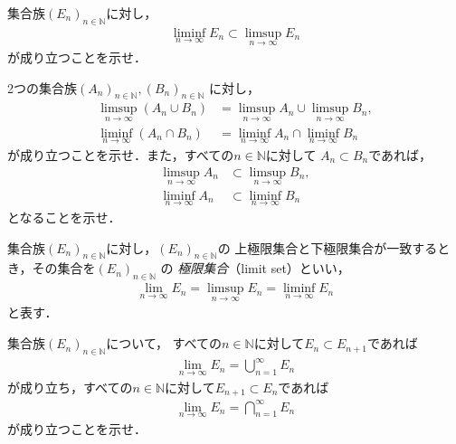     \begin{que} \label{que:limitsupinfsubset}
      集合族$(E_n)_{n \in \mathbb{N}}$に対し，
      \begin{align}
        \liminf_{n \to \infty} E_n \subset \limsup_{n \to \infty} E_n
        \label{eq:limitinfsupsubset}
      \end{align}
      が成り立つことを示せ．
    \end{que}

    \begin{que} \label{que:limitinfsupsetAB}
      2つの集合族$(A_n)_{n \in \mathbb{N}} ,  (B_n)_{n \in \mathbb{N}}$
      に対し，
      \begin{align}
        \limsup_{n \to \infty} (A_n \cup B_n) 
        & = \limsup_{n \to \infty} A_n \cup \limsup_{n \to \infty} B_n ,
        \label{eq:limitsupsetcup} \\
        \liminf_{n \to \infty} (A_n \cap B_n)
        & = \liminf_{n \to \infty} A_n \cap \liminf_{n \to \infty} B_n 
        \label{eq:limitinfsetcap}
      \end{align}
      が成り立つことを示せ．また，すべての$n \in \mathbb{N}$に対して
      $A_n \subset B_n$であれば，
      \begin{align}
        \limsup_{n \to \infty} A_n & \subset \limsup_{n \to \infty} B_n , 
        \label{eq:limitsupsetsub} \\
        \liminf_{n \to \infty} A_n & \subset \liminf_{n \to \infty} B_n
        \label{eq:limitinfsetsub} 
      \end{align}
      となることを示せ．
    \end{que}


    集合族$(E_n)_{n \in \mathbb{N}}$に対し，$(E_n)_{n \in \mathbb{N}}$の
    上極限集合と下極限集合が一致するとき，その集合を$(E_n)_{n \in \mathbb{N}}$
    の
    \emph{極限集合}（limit set）といい，
    \begin{align}
      \lim_{n \to \infty} E_n = \limsup_{n \to \infty} E_n = \liminf_{n \to \infty} E_n
      \label{eq:limitset}
    \end{align}
    と表す．
    
    \begin{que} \label{que:limitsetzoudaigensyou}
      集合族$(E_n)_{n \in \mathbb{N}}$について，
      すべての$n \in \mathbb{N}$に対して$E_n \subset E_{n+1}$であれば
      \begin{align*}
        \lim_{n \to \infty} E_n = \bigcup_{n=1}^{\infty} E_n
      \end{align*}
      が成り立ち，すべての$n \in \mathbb{N}$に対して$E_{n+1} \subset E_n$であれば
      \begin{align*}
        \lim_{n \to \infty} E_n = \bigcap_{n=1}^{\infty} E_n
      \end{align*}
      が成り立つことを示せ．
    \end{que}


